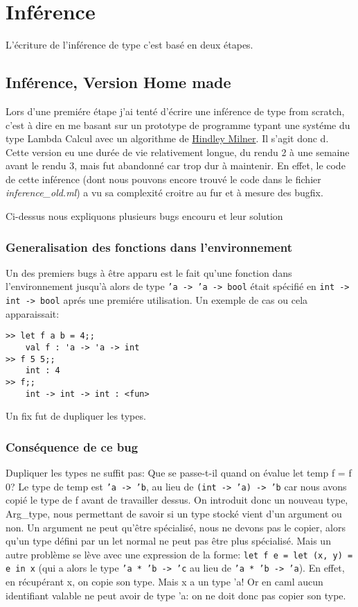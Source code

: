 \documentclass[paper=a4, fontsize=11pt, twocolumn]{article}
\begin{document}
\section{Inférence}
L'écriture de l'inférence de type c'est basé en deux étapes.
\subsection{Inférence, Version Home made}
Lors d'une premiére étape j'ai tenté d'écrire une inférence de type from scratch, c'est à dire en me basant sur un prototype de programme typant une systéme du type Lambda Calcul avec un algorithme de \href{https://en.wikipedia.org/wiki/Hindley\%E2\%80\%93Milner_type_system}{Hindley Milner}. Il s'agit donc d. Cette version eu une durée de vie relativement longue, du rendu 2 à une semaine avant le rendu 3, mais fut abandonné car trop dur à maintenir. En effet, le code de cette inférence (dont nous pouvons encore trouvé le code dans le fichier \textit{inference\_old.ml})  a vu sa complexité croitre au fur et à mesure des bugfix.

Ci-dessus nous expliquons plusieurs bugs encouru et leur solution
\subsubsection{Generalisation des fonctions dans l'environnement}
Un des premiers bugs à être apparu est le fait qu'une fonction dans l'environnement jusqu'à alors de type \texttt{'a -> 'a -> bool} était spécifié en \texttt{int -> int -> bool} aprés une premiére utilisation.
Un exemple de cas ou cela apparaissait:
\begin{verbatim}
>> let f a b = 4;;
	val f : 'a -> 'a -> int
>> f 5 5;;
	int : 4
>> f;;
	int -> int -> int : <fun>
\end{verbatim}
Un fix fut de dupliquer les types.
\subsubsection{Conséquence de ce bug}
Dupliquer les types ne suffit pas: Que se passe-t-il quand on évalue let temp f = f 0? Le type de temp est \texttt{'a -> 'b}, au lieu de \texttt{(int -> 'a) -> 'b} car nous avons copié le type de f avant de travailler dessus. On introduit donc un nouveau type, Arg\_type, nous permettant de savoir si un type stocké vient d'un argument ou non. Un argument ne peut qu'être spécialisé, nous ne devons pas le copier, alors qu'un type défini par un let normal ne peut pas être plus spécialisé. 
Mais un autre problème se lève avec une expression de la forme: \texttt{let f e = let (x, y) = e in x} (qui a alors le type \texttt{'a * 'b -> 'c} au lieu de \texttt{'a * 'b -> 'a}). En effet, en récupérant x, on copie son type. Mais x a un type 'a! Or en caml aucun identifiant valable ne peut avoir de type 'a: on ne doit donc pas copier son type.
\end{document}
